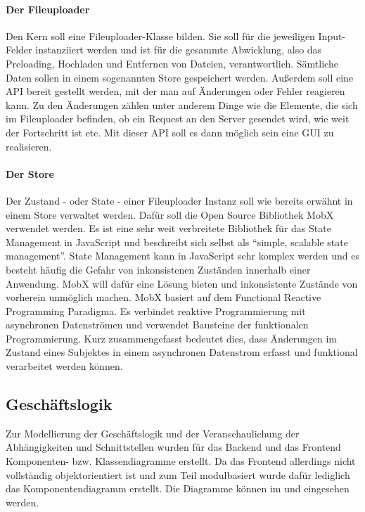 \paragraph{Der Fileuploader} Den Kern soll eine Fileuploader-Klasse bilden. Sie soll für die jeweiligen Input-Felder instanziiert werden und ist für die gesammte Abwicklung, also das Preloading, Hochladen und Entfernen von Dateien, verantwortlich. Sämtliche Daten sollen in einem sogenannten Store gespeichert werden. Außerdem soll eine API bereit gestellt werden, mit der man auf Änderungen oder Fehler reagieren kann. Zu den Änderungen zählen unter anderem Dinge wie die Elemente, die sich im Fileuploader befinden, ob ein Request an den Server gesendet wird, wie weit der Fortschritt ist etc. Mit dieser API soll es dann möglich sein eine GUI zu realisieren. 

\paragraph{Der Store} Der Zustand - oder State - einer Fileuploader Instanz soll wie bereits erwähnt in einem Store verwaltet werden. Dafür soll die Open Source Bibliothek MobX verwendet werden. Es ist eine sehr weit verbreitete Bibliothek für das State Management in JavaScript und beschreibt sich selbst als ``simple, scalable state management''. State Management kann in JavaScript sehr komplex werden und es besteht häufig die Gefahr von inkonsistenen Zuständen innerhalb einer Anwendung. MobX will dafür eine Lösung bieten und inkonsistente Zustände von vorherein unmöglich machen. MobX basiert auf dem Functional Reactive Programming Paradigma. Es verbindet reaktive Programmierung mit asynchronen Datenströmen und verwendet Bausteine der funktionalen Programmierung. Kurz zusammengefasst bedeutet dies, dass Änderungen im Zustand eines Subjektes in einem asynchronen Datenstrom erfasst und funktional verarbeitet werden können.

\subsection{Geschäftslogik}
\label{sec:Geschaeftslogik} 

Zur Modellierung der Geschäftslogik und der Veranschaulichung der Abhängigkeiten und Schnittstellen  wurden für das Backend und das Frontend Komponenten- bzw. Klassendiagramme erstellt. Da das Frontend allerdings nicht vollständig objektorientiert ist und zum Teil modulbasiert wurde dafür lediglich das Komponentendiagramm erstellt. Die Diagramme können im  und  eingesehen werden. 

